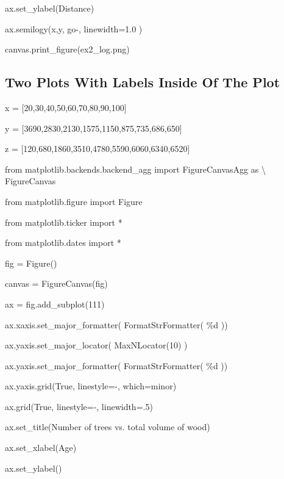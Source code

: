 \documentclass[12pt,twoside]{book}
\begin{document}
ax.set\_ylabel({\textquotesingle}Distance{\textquotesingle})

ax.semilogy(x,y, {\textquotesingle}go{}-{\textquotesingle},
linewidth=1.0 )

canvas.print\_figure({\textquotesingle}ex2\_log.png{\textquotesingle})

{\textbar}


\bigskip

\subsection[Two Plots With Labels Inside Of The Plot]{ Two Plots With Labels Inside Of The Plot}

\bigskip

x = [20,30,40,50,60,70,80,90,100]

y = [3690,2830,2130,1575,1150,875,735,686,650]

z = [120,680,1860,3510,4780,5590,6060,6340,6520]


\bigskip

from matplotlib.backends.backend\_agg import FigureCanvasAgg as
{\textbackslash} FigureCanvas

from matplotlib.figure import Figure

from matplotlib.ticker import *

from matplotlib.dates import *

fig = Figure()

canvas = FigureCanvas(fig)

ax = fig.add\_subplot(111)

ax.xaxis.set\_major\_formatter( FormatStrFormatter(
{\textquotesingle}\%d{\textquotesingle} ))

ax.yaxis.set\_major\_locator( MaxNLocator(10) )

ax.yaxis.set\_major\_formatter( FormatStrFormatter(
{\textquotesingle}\%d{\textquotesingle} ))

ax.yaxis.grid(True, linestyle={\textquotesingle}{}-{\textquotesingle},
which={\textquotesingle}minor{\textquotesingle})

ax.grid(True, linestyle={\textquotesingle}{}-{\textquotesingle},
linewidth=.5)

ax.set\_title({\textquotesingle}Number of trees vs. total volume of
wood{\textquotesingle})

ax.set\_xlabel({\textquotesingle}Age{\textquotesingle})

ax.set\_ylabel({\textquotesingle}{\textquotesingle})
\end{document}
